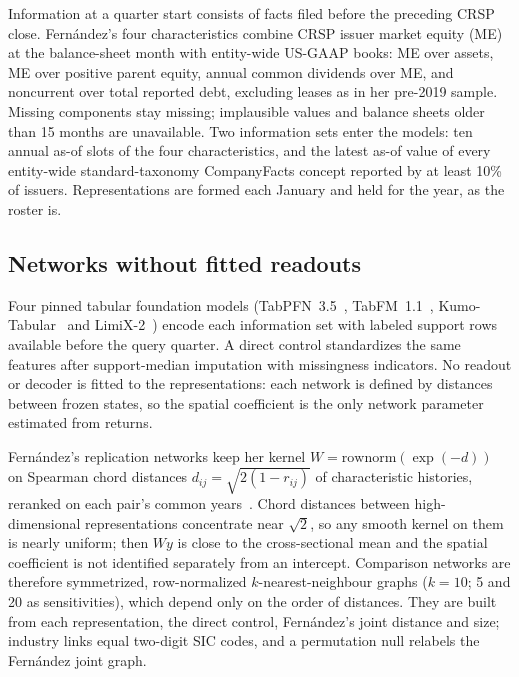 \documentclass[11pt]{article}
\begin{document}
Information at a quarter start consists of facts filed before the preceding
CRSP close. Fern\'andez's four characteristics combine CRSP issuer market equity
(ME) at the balance-sheet month with entity-wide US-GAAP books: ME over assets,
ME over positive parent equity, annual common dividends over ME, and noncurrent
over total reported debt, excluding leases as in her pre-2019 sample. Missing
components stay missing; implausible values and balance sheets older than 15
months are unavailable. Two information sets enter the models: ten annual as-of
slots of the four characteristics, and the latest as-of value of
every entity-wide
standard-taxonomy CompanyFacts concept reported by at least 10\% of issuers.
Representations are formed each January and held for the year, as the roster is.

\subsection{Networks without fitted readouts}
Four pinned tabular foundation models
(TabPFN~3.5~\cite{hollmann2025}, TabFM~1.1~\cite{kong2026tabfm},
Kumo-Tabular~\cite{nvidia2026kumo} and LimiX-2~\cite{zhang2026limix})
encode each
information set with labeled support rows available before the query quarter. A
direct control standardizes the same features after support-median
imputation with
missingness indicators. No readout or decoder is fitted to the representations:
each network is defined by distances between frozen states, so the spatial
coefficient is the only network parameter estimated from returns.

Fern\'andez's replication networks keep her kernel
$W=\mathrm{rownorm}(\exp(-d))$ on Spearman chord distances
$d_{ij}=\sqrt{2(1-r_{ij})}$ of characteristic histories, reranked on each pair's
common years~\cite{fernandez2011}. Chord distances between high-dimensional
representations concentrate near $\sqrt2$, so any smooth kernel on
them is nearly
uniform; then $Wy$ is close to the cross-sectional mean and the
spatial coefficient
is not identified separately from an intercept. Comparison networks
are therefore
symmetrized, row-normalized $k$-nearest-neighbour graphs ($k=10$; 5 and 20 as
sensitivities), which depend only on the order of distances. They are built from
each representation, the direct control, Fern\'andez's joint distance and size;
industry links equal two-digit SIC codes, and a permutation null relabels the
Fern\'andez joint graph.
\end{document}
